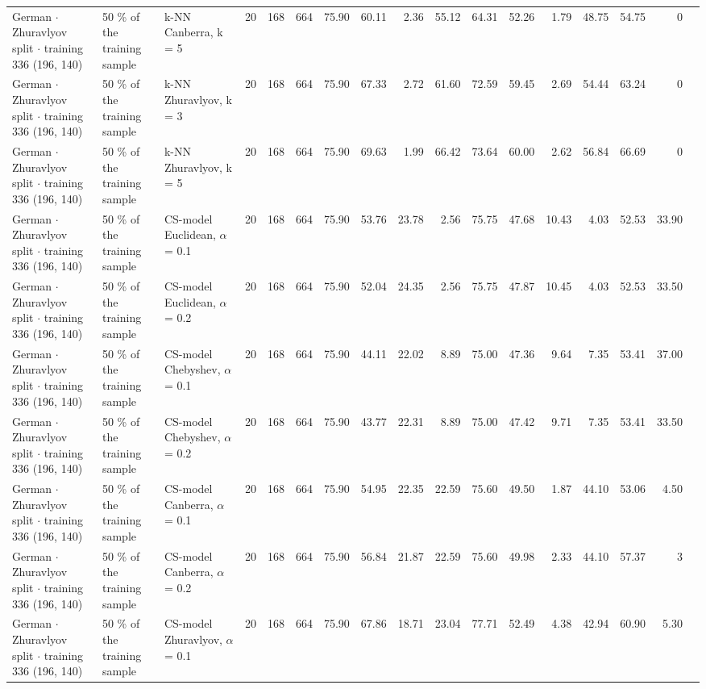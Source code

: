 \begin{longtable}{lllrrrrrrrrrrrrrl}
  German $\cdot$ Zhuravlyov split $\cdot$ training 336 (196, 140) & 50 \% of the training sample & k-NN Canberra, k = 5 & 20 & 168 & 664 & 75.90 & 60.11 & 2.36 & 55.12 & 64.31 & 52.26 & 1.79 & 48.75 & 54.75 & 0 &  \\
  German $\cdot$ Zhuravlyov split $\cdot$ training 336 (196, 140) & 50 \% of the training sample & k-NN Zhuravlyov, k = 3 & 20 & 168 & 664 & 75.90 & 67.33 & 2.72 & 61.60 & 72.59 & 59.45 & 2.69 & 54.44 & 63.24 & 0 &  \\
  German $\cdot$ Zhuravlyov split $\cdot$ training 336 (196, 140) & 50 \% of the training sample & k-NN Zhuravlyov, k = 5 & 20 & 168 & 664 & 75.90 & 69.63 & 1.99 & 66.42 & 73.64 & 60.00 & 2.62 & 56.84 & 66.69 & 0 &  \\
  German $\cdot$ Zhuravlyov split $\cdot$ training 336 (196, 140) & 50 \% of the training sample & CS-model Euclidean, $\alpha$ = 0.1 & 20 & 168 & 664 & 75.90 & 53.76 & 23.78 & 2.56 & 75.75 & 47.68 & 10.43 & 4.03 & 52.53 & 33.90 &  \\
  German $\cdot$ Zhuravlyov split $\cdot$ training 336 (196, 140) & 50 \% of the training sample & CS-model Euclidean, $\alpha$ = 0.2 & 20 & 168 & 664 & 75.90 & 52.04 & 24.35 & 2.56 & 75.75 & 47.87 & 10.45 & 4.03 & 52.53 & 33.50 &  \\
  German $\cdot$ Zhuravlyov split $\cdot$ training 336 (196, 140) & 50 \% of the training sample & CS-model Chebyshev, $\alpha$ = 0.1 & 20 & 168 & 664 & 75.90 & 44.11 & 22.02 & 8.89 & 75.00 & 47.36 & 9.64 & 7.35 & 53.41 & 37.00 &  \\
  German $\cdot$ Zhuravlyov split $\cdot$ training 336 (196, 140) & 50 \% of the training sample & CS-model Chebyshev, $\alpha$ = 0.2 & 20 & 168 & 664 & 75.90 & 43.77 & 22.31 & 8.89 & 75.00 & 47.42 & 9.71 & 7.35 & 53.41 & 33.50 &  \\
  German $\cdot$ Zhuravlyov split $\cdot$ training 336 (196, 140) & 50 \% of the training sample & CS-model Canberra, $\alpha$ = 0.1 & 20 & 168 & 664 & 75.90 & 54.95 & 22.35 & 22.59 & 75.60 & 49.50 & 1.87 & 44.10 & 53.06 & 4.50 &  \\
  German $\cdot$ Zhuravlyov split $\cdot$ training 336 (196, 140) & 50 \% of the training sample & CS-model Canberra, $\alpha$ = 0.2 & 20 & 168 & 664 & 75.90 & 56.84 & 21.87 & 22.59 & 75.60 & 49.98 & 2.33 & 44.10 & 57.37 & 3 &  \\
  German $\cdot$ Zhuravlyov split $\cdot$ training 336 (196, 140) & 50 \% of the training sample & CS-model Zhuravlyov, $\alpha$ = 0.1 & 20 & 168 & 664 & 75.90 & 67.86 & 18.71 & 23.04 & 77.71 & 52.49 & 4.38 & 42.94 & 60.90 & 5.30 &  \\

\end{longtable}
